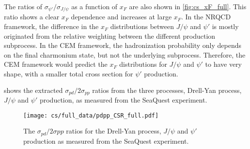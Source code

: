 \documentclass[../main.tex]{subfiles}
\begin{document}
The ratios of $\sigma_{\psi'}/\sigma_{J/\psi}$ as a function of $x_F$ are also shown in \cref{fig:cs_xF_full}.
This ratio shows a clear $x_F$ dependence and increases at large $x_F$. In the NRQCD framework,
the difference in the $x_F$ distributions between $J/\psi$ and $\psi'$ is mostly originated
from the relative weighting between the different production subprocess.
In the CEM framework, the hadronization probability only depends on
the final charmonium state, but not the underlying subprocess. Therefore, the CEM framework would predict
the $x_F$ distributions for $J/\psi$ and $\psi'$ to have very shape, with a smaller total cross section
for $\psi'$ production.

 shows the extracted $\sigma_{pd}/2\sigma_{pp}$ ratios from the three processes,
Drell-Yan process, $J/\psi$ and $\psi'$ production, as measured from the SeaQuest experiment.
\begin{figure}[h!]
	\centering
	\texttt{[image: cs/full\_data/pdpp\_CSR\_full.pdf]}
	\caption{The $\sigma_{pd}/2\sigma{pp}$ ratios for the Drell-Yan process, $J/\psi$ and $\psi'$ production
		as measured from the SeaQuest experiment.
	}
	\label{fig:csr_all_process}
\end{figure}


\FloatBarrier
\end{document}
